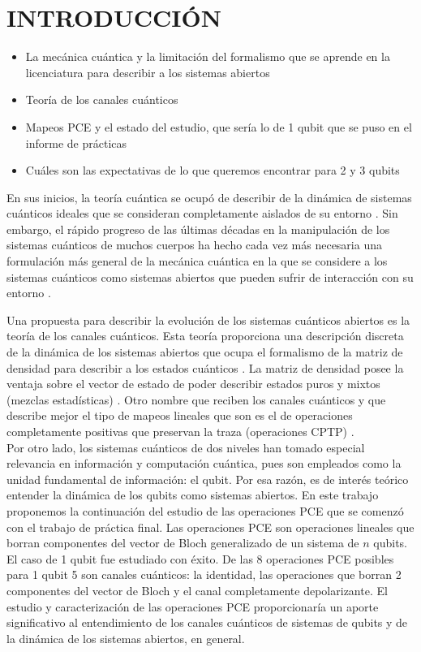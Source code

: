 \chapter{INTRODUCCIÓN}
\textcolor{mycolor}{
\begin{itemize}
\item La mecánica cuántica y la limitación del formalismo que se 
aprende en la licenciatura para describir a los sistemas abiertos
\item Teoría de los canales cuánticos
\item Mapeos PCE y el estado del estudio, que sería lo de 1
qubit que se puso en el informe de prácticas
\item Cuáles son las expectativas de lo que queremos encontrar 
para 2 y 3 qubits
\end{itemize}
}

En sus inicios, la teoría cuántica se ocupó de describir de la dinámica 
de sistemas cuánticos ideales que se consideran completamente aislados 
de su entorno \cite{feynman1965feyman}. Sin embargo, el rápido progreso
de las últimas décadas en la manipulación de los sistemas cuánticos de 
muchos cuerpos ha hecho cada vez más necesaria una formulación 
más general de la mecánica cuántica en la que se considere a 
los sistemas cuánticos como sistemas abiertos que pueden sufrir de 
interacción con su entorno \cite{preskill1998lecture}.

Una propuesta para describir la evolución de los sistemas cuánticos abiertos
es la teoría de los canales cuánticos. Esta teoría proporciona una descripción
discreta de la dinámica de los sistemas abiertos que ocupa el formalismo
de la matriz de densidad para describir a los estados cuánticos
\cite{nielsen_chuang_2011}. La matriz
de densidad posee la ventaja sobre el vector de estado de poder describir
estados puros y mixtos (mezclas estadísticas) \cite{sakurai_napolitano_2017}. 
Otro nombre que reciben 
los canales cuánticos y que describe mejor el tipo de mapeos lineales 
que son es el de operaciones completamente positivas que preservan la traza 
(operaciones CPTP) \cite{bengtsson_zyczkowski_2017}.\\

Por otro lado, los sistemas cuánticos de dos niveles han tomado especial
relevancia en información y computación cuántica, pues son empleados 
como la unidad fundamental de información: el qubit. Por esa razón, es
de interés teórico entender la dinámica de los qubits como sistemas 
abiertos. En este trabajo proponemos la continuación del estudio de 
las operaciones PCE que se comenzó con el trabajo de práctica final.
Las operaciones PCE son operaciones lineales que borran componentes
del vector de Bloch generalizado de un sistema de $n$ qubits. El caso 
de 1 qubit fue estudiado con éxito. De las 8 operaciones PCE posibles para
1 qubit 5 son canales cuánticos: la identidad, las operaciones que borran 2 
componentes del vector de Bloch y el canal completamente depolarizante.
El estudio y caracterización de las operaciones PCE proporcionaría 
un aporte significativo al entendimiento de los canales cuánticos de
sistemas de qubits y de la dinámica de los sistemas abiertos, en general.\\


